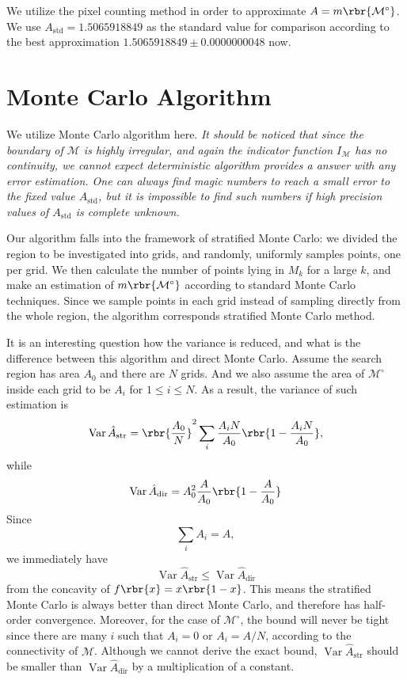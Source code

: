 \documentclass[english, nochinese]{pnote}
\DeclareMathOperator\opvar{\mathrm{Var}}
\begin{document}
We utilize the pixel counting method in order to approximate $ A = m \rbr{\mathcal{M}^{\circ}} $. We use $ A_{\text{std}} = 1.5065918849 $ as the standard value for comparison according to the best approximation $ 1.5065918849 \pm 0.0000000048 $ now.

\section{Monte Carlo Algorithm}

We utilize Monte Carlo algorithm here. \emph{It should be noticed that since the boundary of $\mathcal{M}$ is highly irregular, and again the indicator function $I_{\mathcal{M}}$ has no continuity, we cannot expect deterministic algorithm provides a answer with any error estimation. One can always find magic numbers to reach a small error to the fixed value $A_{\text{std}}$, but it is impossible to find such numbers if high precision values of $A_{\text{std}}$ is complete unknown.}

Our algorithm falls into the framework of stratified Monte Carlo: we divided the region to be investigated into grids, and randomly, uniformly samples points, one per grid. We then calculate the number of points lying in $M_k$ for a large $k$, and make an estimation of $ m \rbr{\mathcal{M}^{\circ}} $ according to standard Monte Carlo techniques. Since we sample points in each grid instead of sampling directly from the whole region, the algorithm corresponds stratified Monte Carlo method.

It is an interesting question how the variance is reduced, and what is the difference between this algorithm and direct Monte Carlo. Assume the search region has area $A_0$ and there are $N$ grids. And we also assume the area of $\mathcal{M}^{\circ}$ inside each grid to be $A_i$ for $ 1 \le i \le N $. As a result, the variance of such estimation is
\begin{equation}
\opvar \hat{A}_{\text{str}} = \rbr{\frac{A_0}{N}}^2 \sum_i \frac{ A_i N }{A_0} \rbr{ 1 - \frac{ A_i N }{A_0 } },
\end{equation}
while
\begin{equation}
\opvar \hat{A}_{\text{dir}} = A_0^2 \frac{A}{A_0} \rbr{ 1 - \frac{A}{A_0} }
\end{equation}
Since
\begin{equation}
\sum_i A_i = A,
\end{equation}
we immediately have
\begin{equation}
\opvar \hat{A}_{\text{str}} \le \opvar \hat{A}_{\text{dir}}
\end{equation}
from the concavity of $ f \rbr{x} = x \rbr{ 1 - x } $. This means the stratified Monte Carlo is always better than direct Monte Carlo, and therefore has half-order convergence. Moreover, for the case of $\mathcal{M}^{\circ}$, the bound will never be tight since there are many $i$ such that $ A_i = 0 $ or $ A_i = A / N $, according to the connectivity of $\mathcal{M}$. Although we cannot derive the exact bound, $ \opvar \hat{A}_{\text{str}} $ should be smaller than $ \opvar \hat{A}_{\text{dir}} $ by a multiplication of a constant.
\end{document}
